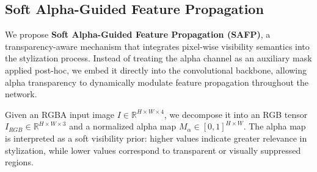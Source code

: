 \documentclass[letterpaper]{article} %
\begin{document}





\subsection{Soft Alpha-Guided Feature Propagation}

We propose \textbf{Soft Alpha-Guided Feature Propagation (SAFP)}, a transparency-aware mechanism that integrates pixel-wise visibility semantics into the stylization process. Instead of treating the alpha channel as an auxiliary mask applied post-hoc, we embed it directly into the convolutional backbone, allowing alpha transparency to dynamically modulate feature propagation throughout the network.

Given an RGBA input image $I \in \mathbb{R}^{H \times W \times 4}$, we decompose it into an RGB tensor $I_{RGB} \in \mathbb{R}^{H \times W \times 3}$ and a normalized alpha map $M_\alpha \in [0, 1]^{H \times W}$. The alpha map is interpreted as a soft visibility prior: higher values indicate greater relevance in stylization, while lower values correspond to transparent or visually suppressed regions.
\end{document}
